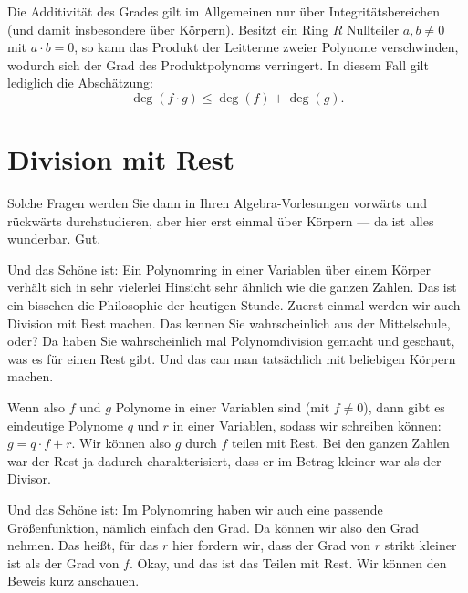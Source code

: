 \begin{didactic-insight}
Die Additivität des Grades gilt im Allgemeinen nur über Integritätsbereichen (und damit insbesondere über Körpern). Besitzt ein Ring $R$ Nullteiler $a, b \neq 0$ mit $a \cdot b = 0$, so kann das Produkt der Leitterme zweier Polynome verschwinden, wodurch sich der Grad des Produktpolynoms verringert. In diesem Fall gilt lediglich die Abschätzung:
\[
\deg(f \cdot g) \le \deg(f) + \deg(g).
\]
\end{didactic-insight}

\section{Division mit Rest}

\begin{spoken-clean}[00:18:00 - 00:22:50]
Solche Fragen werden Sie dann in Ihren Algebra-Vorlesungen vorwärts und rückwärts durchstudieren, aber hier erst einmal über Körpern --- da ist alles wunderbar. Gut.

Und das Schöne ist: Ein Polynomring in einer Variablen über einem Körper verhält sich in sehr vielerlei Hinsicht sehr ähnlich wie die ganzen Zahlen. Das ist ein bisschen die Philosophie der heutigen Stunde. Zuerst einmal werden wir auch Division mit Rest machen. Das kennen Sie wahrscheinlich aus der Mittelschule, oder? Da haben Sie wahrscheinlich mal Polynomdivision gemacht und geschaut, was es für einen Rest gibt. Und das can man tatsächlich mit beliebigen Körpern machen.

Wenn also $f$ und $g$ Polynome in einer Variablen sind (mit $f \neq 0$), dann gibt es eindeutige Polynome $q$ und $r$ in einer Variablen, sodass wir schreiben können: $g = q \cdot f + r$. Wir können also $g$ durch $f$ teilen mit Rest. Bei den ganzen Zahlen war der Rest ja dadurch charakterisiert, dass er im Betrag kleiner war als der Divisor.

Und das Schöne ist: Im Polynomring haben wir auch eine passende Größenfunktion, nämlich einfach den Grad. Da können wir also den Grad nehmen. Das heißt, für das $r$ hier fordern wir, dass der Grad von $r$ strikt kleiner ist als der Grad von $f$. Okay, und das ist das Teilen mit Rest. Wir können den Beweis kurz anschauen.
\end{spoken-clean}

\begin{math-stroke}
\end{math-stroke}

